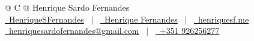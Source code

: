 \documentclass[a4paper,11pt]{article}
\begin{document}
\pagestyle{empty}



\begin{tabularx}{\linewidth}{@{} C @{}}
\Huge{Henrique Sardo Fernandes} \\[7.5pt]
\href{https://github.com/HenriqueSFernandes}{\raisebox{-0.05\height}\faGithub\ HenriqueSFernandes} \ $|$ \
\href{https://linkedin.com/in/-henriquesfernandes}{\raisebox{-0.05\height}\faLinkedin\ Henrique Fernandes} \ $|$ \
\href{https://henriquesf.me}{\raisebox{-0.05\height}\faGlobe \ henriquesf.me} \\
\href{mailto:henriquesardofernandes@gmail.com}{\raisebox{-0.05\height}\faEnvelope \ henriquesardofernandes@gmail.com} \ $|$ \
\href{tel:+351926256277}{\raisebox{-0.05\height}\faMobile \ +351 926256277} \\
\end{tabularx}


%
\end{document}
